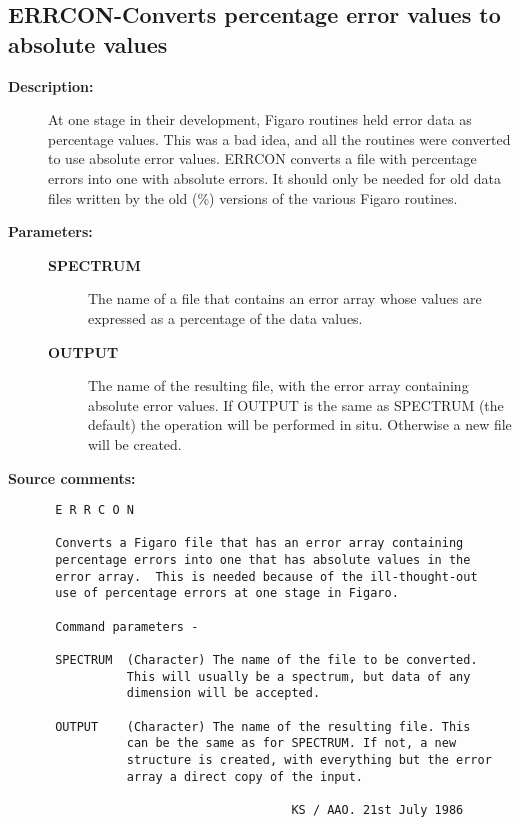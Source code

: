 \subsection{ERRCON-\label{ERRCON}Converts percentage error values to absolute values}
\begin{description}

\item [{\bf Description:}]
 At one stage in their development, Figaro routines held error data
 as percentage values.  This was a bad idea, and all the routines
 were converted to use absolute error values.  ERRCON converts a
 file with percentage errors into one with absolute errors.  It
 should only be needed for old data files written by the old (\%)
 versions of the various Figaro routines.

\item [{\bf Parameters:}]
\begin{description}
\item [{\bf SPECTRUM}]
 The name of a file that contains an error array whose
 values are expressed as a percentage of the data values.
\item [{\bf OUTPUT}]
 The name of the resulting file, with the error array
 containing absolute error values.  If OUTPUT is the
 same as SPECTRUM (the default) the operation will be
 performed in situ.  Otherwise a new file will be created.
\end{description}

\item [{\bf Source comments:}]
\begin{verbatim}
 E R R C O N

 Converts a Figaro file that has an error array containing
 percentage errors into one that has absolute values in the
 error array.  This is needed because of the ill-thought-out
 use of percentage errors at one stage in Figaro.

 Command parameters -

 SPECTRUM  (Character) The name of the file to be converted.
           This will usually be a spectrum, but data of any
           dimension will be accepted.

 OUTPUT    (Character) The name of the resulting file. This
           can be the same as for SPECTRUM. If not, a new
           structure is created, with everything but the error
           array a direct copy of the input.

                                  KS / AAO. 21st July 1986
\end{verbatim}
\end{description}
